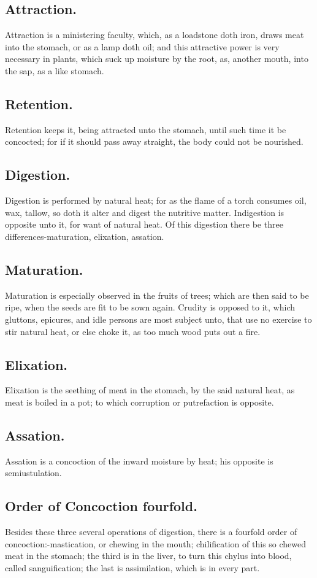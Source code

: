 {\subsection{Attraction.}
Attraction is a ministering faculty, which, as a
loadstone doth iron, draws meat into the stomach, or as a lamp doth
oil; and this attractive power is very necessary in plants, which suck
up moisture by the root, as, another mouth, into the sap, as a like
stomach.
\subsection{Retention.}
Retention keeps it, being attracted unto the stomach,
until such time it be concocted; for if it should pass away straight,
the body could not be nourished.
\subsection{Digestion.}
Digestion is performed by natural heat; for as the flame
of a torch consumes oil, wax, tallow, so doth it alter and digest the
nutritive matter. Indigestion is opposite unto it, for want of natural
heat. Of this digestion there be three differences-maturation,
elixation, assation.
\subsection{Maturation.}
Maturation is especially observed in the fruits of
trees; which are then said to be ripe, when the seeds are fit to be
sown again. Crudity is opposed to it, which gluttons, epicures, and
idle persons are most subject unto, that use no exercise to stir
natural heat, or else choke it, as too much wood puts out a fire.
\subsection{Elixation.}
Elixation is the seething of meat in the stomach, by the
said natural heat, as meat is boiled in a pot; to which corruption or
putrefaction is opposite.
\subsection{Assation.}
Assation is a concoction of the inward moisture by heat;
his opposite is semiustulation.
\subsection{Order of Concoction fourfold.}
Besides these three several operations
of digestion, there is a fourfold order of concoction:-mastication, or
chewing in the mouth; chilification of this so chewed meat in the
stomach; the third is in the liver, to turn this chylus into blood,
called sanguification; the last is assimilation, which is in every
part.
}
